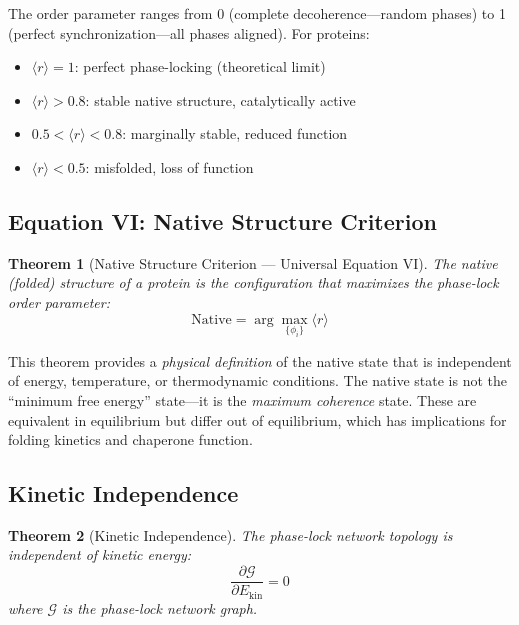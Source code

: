 \documentclass[aps,prx,superscriptaddress,twocolumn,10pt,a4paper,longbibliography,preprint]{revtex4-2}
\newcommand{\calG}{\mathcal{G}}
\newcommand{\orderp}{\langle r \rangle}
\newtheorem{theorem}{Theorem}[section]
\theoremstyle{definition}
\theoremstyle{remark}
\begin{document}
The order parameter ranges from 0 (complete decoherence---random phases) to 1 (perfect synchronization---all phases aligned). For proteins:
\begin{itemize}
\item $\orderp = 1$: perfect phase-locking (theoretical limit)
\item $\orderp > 0.8$: stable native structure, catalytically active
\item $0.5 < \orderp < 0.8$: marginally stable, reduced function
\item $\orderp < 0.5$: misfolded, loss of function
\end{itemize}

\subsection{Equation VI: Native Structure Criterion}

\begin{theorem}[Native Structure Criterion --- Universal Equation VI]
\label{thm:native}
The native (folded) structure of a protein is the configuration that maximizes the phase-lock order parameter:
\begin{equation}
\boxed{\text{Native} = \arg\max_{\{\phi_i\}} \orderp}
\label{eq:native}
\end{equation}
\end{theorem}

This theorem provides a \emph{physical definition} of the native state that is independent of energy, temperature, or thermodynamic conditions. The native state is not the ``minimum free energy'' state---it is the \emph{maximum coherence} state. These are equivalent in equilibrium but differ out of equilibrium, which has implications for folding kinetics and chaperone function.

\subsection{Kinetic Independence}

\begin{theorem}[Kinetic Independence]
\label{thm:kinetic_indep}
The phase-lock network topology is independent of kinetic energy:
\begin{equation}
\frac{\partial \calG}{\partial E_{\text{kin}}} = 0
\label{eq:kinetic_indep}
\end{equation}
where $\calG$ is the phase-lock network graph.
\end{theorem}
\end{document}
